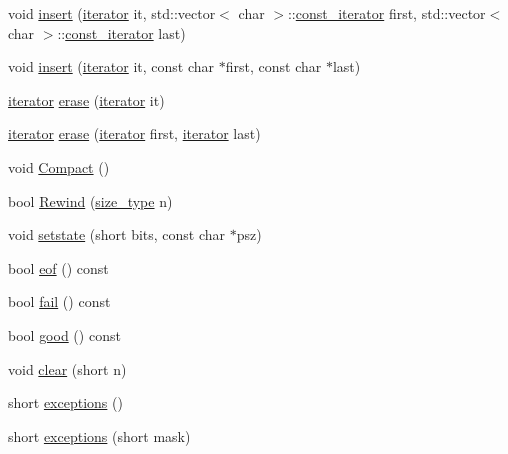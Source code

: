 \begin{DoxyCompactItemize}
\item 
void \hyperlink{class_c_data_stream_aa15a60d7ee6d987de444426f2825f284}{insert} (\hyperlink{class_c_data_stream_abed2013224bdf424e51c78bf483886d3}{iterator} it, std\+::vector$<$ char $>$\+::\hyperlink{class_c_data_stream_abcfd79b72607505b22f18424e313b4c5}{const\+\_\+iterator} first, std\+::vector$<$ char $>$\+::\hyperlink{class_c_data_stream_abcfd79b72607505b22f18424e313b4c5}{const\+\_\+iterator} last)
\item 
void \hyperlink{class_c_data_stream_a9635fda38bc0b7836b4364820a67a18d}{insert} (\hyperlink{class_c_data_stream_abed2013224bdf424e51c78bf483886d3}{iterator} it, const char $\ast$first, const char $\ast$last)
\item 
\hyperlink{class_c_data_stream_abed2013224bdf424e51c78bf483886d3}{iterator} \hyperlink{class_c_data_stream_acb2a195db823f11161ea07c4855e0333}{erase} (\hyperlink{class_c_data_stream_abed2013224bdf424e51c78bf483886d3}{iterator} it)
\item 
\hyperlink{class_c_data_stream_abed2013224bdf424e51c78bf483886d3}{iterator} \hyperlink{class_c_data_stream_a7446b23bcfa37cbfa79ccc66f8aff48a}{erase} (\hyperlink{class_c_data_stream_abed2013224bdf424e51c78bf483886d3}{iterator} first, \hyperlink{class_c_data_stream_abed2013224bdf424e51c78bf483886d3}{iterator} last)
\item 
void \hyperlink{class_c_data_stream_a84c3fd4cf194f3402dc8adce6ab3ccf9}{Compact} ()
\item 
bool \hyperlink{class_c_data_stream_a7054311b2fe016b21fb853a1e27812d9}{Rewind} (\hyperlink{class_c_data_stream_a79e10daad6db0f94aea1e811eb167378}{size\+\_\+type} n)
\item 
void \hyperlink{class_c_data_stream_a6de6e858ed25edc9d0034669cbe62664}{setstate} (short bits, const char $\ast$psz)
\item 
bool \hyperlink{class_c_data_stream_abf5a9f3a26a56ef1ea1fb56b674677bf}{eof} () const 
\item 
bool \hyperlink{class_c_data_stream_a6fa8449cdf642ad4b7bbcc9774a0d6f9}{fail} () const 
\item 
bool \hyperlink{class_c_data_stream_a372da4ff0d3ace5f7183ab6278f8f753}{good} () const 
\item 
void \hyperlink{class_c_data_stream_a19613f006ab2d8d4fec67cb7c749561e}{clear} (short n)
\item 
short \hyperlink{class_c_data_stream_ac2d650125487986593a0f320d87f3bdf}{exceptions} ()
\item 
short \hyperlink{class_c_data_stream_ab1eb272d580fcfb5e544a15b6fd53389}{exceptions} (short mask)

\end{DoxyCompactItemize}
